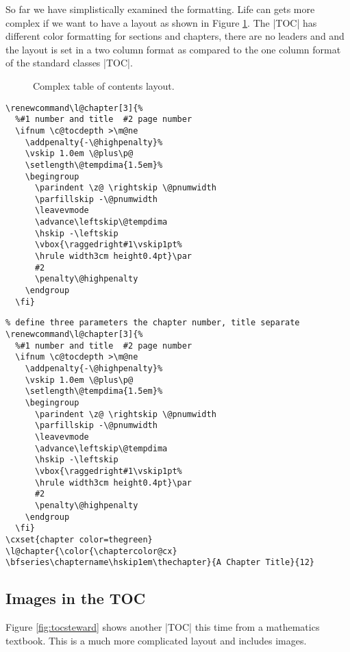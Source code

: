 So far we have simplistically examined the formatting. Life can gets more complex if we want to have a layout as shown in Figure \ref{fig:toc}. The |TOC| has different color formatting for sections and chapters, there are no leaders and and the layout is set in a two column format as compared to the one column format of the standard classes |TOC|.

\begin{figure}[tp]
\centering
{}
\caption{Complex table of contents layout.}
\label{fig:toc}
\end{figure}


\begin{lstlisting}
\renewcommand\l@chapter[3]{%
  %#1 number and title  #2 page number
  \ifnum \c@tocdepth >\m@ne
    \addpenalty{-\@highpenalty}%
    \vskip 1.0em \@plus\p@
    \setlength\@tempdima{1.5em}%
    \begingroup
      \parindent \z@ \rightskip \@pnumwidth
      \parfillskip -\@pnumwidth
      \leavevmode
      \advance\leftskip\@tempdima
      \hskip -\leftskip
      \vbox{\raggedright#1\vskip1pt%
      \hrule width3cm height0.4pt}\par
      #2
      \penalty\@highpenalty
    \endgroup
  \fi}
\end{lstlisting}

\begin{lstlisting}
% define three parameters the chapter number, title separate
\renewcommand\l@chapter[3]{%
  %#1 number and title  #2 page number
  \ifnum \c@tocdepth >\m@ne
    \addpenalty{-\@highpenalty}%
    \vskip 1.0em \@plus\p@
    \setlength\@tempdima{1.5em}%
    \begingroup
      \parindent \z@ \rightskip \@pnumwidth
      \parfillskip -\@pnumwidth
      \leavevmode
      \advance\leftskip\@tempdima
      \hskip -\leftskip
      \vbox{\raggedright#1\vskip1pt%
      \hrule width3cm height0.4pt}\par
      #2
      \penalty\@highpenalty
    \endgroup
  \fi}
\cxset{chapter color=thegreen}
\l@chapter{\color{\chaptercolor@cx}
\bfseries\chaptername\hskip1em\thechapter}{A Chapter Title}{12}
\end{lstlisting}


\subsection{Images in the TOC}
Figure \ref{fig:tocsteward} shows another |TOC| this time from a mathematics textbook. This is a much more complicated layout and includes images.

